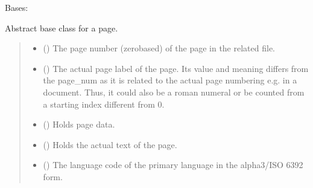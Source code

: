 \documentclass[letterpaper,10pt,english]{sphinxmanual}
\begin{document}
\begin{fulllineitems}
\label{\detokenize{generated/bp_text.page:bp_text.page.Page}}
\pysigstartsignatures
\pysiglinewithargsret
{}
{\sphinxparamcomma {}\sphinxparamcomma {}\sphinxparamcomma {}\sphinxparamcomma {}}
{}
\pysigstopsignatures
\sphinxAtStartPar
Bases: 

\sphinxAtStartPar
Abstract base class for a page.
\begin{quote}\begin{description}
\begin{itemize}
\item {} 
\sphinxAtStartPar
{} () \textendash{} The page number (zero\sphinxhyphen{}based) of the page in the related
file.

\item {} 
\sphinxAtStartPar
{} () \textendash{} The actual page label of the page.  Its value and meaning
differs from the page\_num as it is related to the actual page numbering
e.g. in a document.  Thus, it could also be a roman numeral or be
counted from a starting index different from 0.

\item {} 
\sphinxAtStartPar
{} () \textendash{} Holds page data.

\item {} 
\sphinxAtStartPar
{} () \textendash{} Holds the actual text of the page.

\item {} 
\sphinxAtStartPar
{} () \textendash{} The language code of the primary language in the alpha3/ISO
639\sphinxhyphen{}2 form.


\end{itemize}
\end{description}
\end{quote}
\end{fulllineitems}
\end{document}
